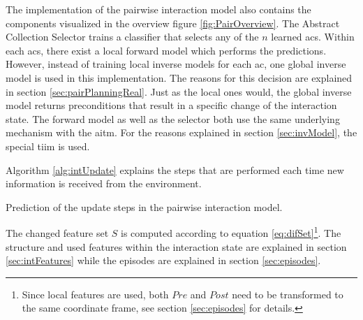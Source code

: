 The implementation of the pairwise interaction model also contains the components visualized in the overview figure \ref{fig:PairOverview}.
The Abstract Collection Selector trains a classifier that selects any of the $n$ learned \glspl{ac}. Within each \glspl{ac}, there exist a local forward model which performs the predictions.
However, instead of training local inverse models for each \gls{ac}, one global inverse model is used in this implementation. The reasons for this decision are explained in section \ref{sec:pairPlanningReal}.
Just as the local ones would, the global inverse model returns preconditions that result in a specific change of the interaction state.
The forward model as well as the selector both use the same underlying mechanism with the \acrfull{aitm}. For the reasons explained in section \ref{sec:invModel}, the special \acrfull{tiim} is used.

Algorithm \ref{alg:intUpdate} explains the steps that are performed each time new information is received from the environment.

\begin{algorithm}
	\BlankLine
	\caption{Prediction of the update steps in the pairwise interaction model.}
	\label{alg:intUpdate}
\end{algorithm}

The changed feature set $S$ is computed according to equation \ref{eq:difSet}\footnote{Since local features are used, both $Pre$ and $Post$ need to be transformed to the same coordinate frame, see section \ref{sec:episodes} for details.}. The structure and used features within the interaction state are explained in section \ref{sec:intFeatures} while the episodes are explained in section \ref{sec:episodes}.


